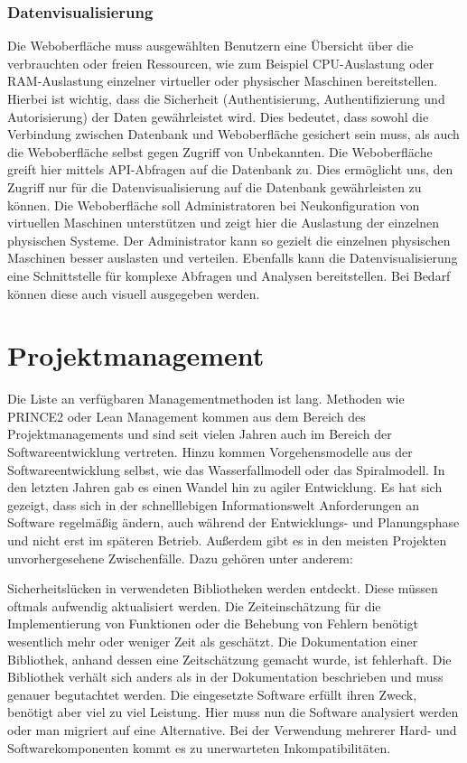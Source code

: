 \subsection{Datenvisualisierung}
Die Weboberfläche muss ausgewählten Benutzern eine Übersicht über die
verbrauchten oder freien Ressourcen, wie zum Beispiel CPU-Auslastung oder
RAM-Auslastung einzelner virtueller oder physischer Maschinen bereitstellen.
Hierbei ist wichtig, dass die Sicherheit (Authentisierung, Authentifizierung
und Autorisierung) der Daten gewährleistet wird. Dies bedeutet, dass sowohl die
Verbindung zwischen Datenbank und Weboberfläche gesichert sein muss, als auch
die Weboberfläche selbst gegen Zugriff von Unbekannten. Die Weboberfläche
greift hier mittels API-Abfragen auf die Datenbank zu. Dies ermöglicht uns, den
Zugriff nur für die Datenvisualisierung auf die Datenbank gewährleisten zu
können. Die Weboberfläche soll Administratoren bei Neukonfiguration von
virtuellen Maschinen unterstützen und zeigt hier die Auslastung der einzelnen
physischen Systeme. Der Administrator kann so gezielt die einzelnen physischen
Maschinen besser auslasten und verteilen. Ebenfalls kann die
Datenvisualisierung eine Schnittstelle für komplexe Abfragen und Analysen
bereitstellen. Bei Bedarf können diese auch visuell ausgegeben werden.
\mr%

\chapter{Projektmanagement}
Die Liste an verfügbaren Managementmethoden ist lang. Methoden wie PRINCE2 oder
Lean Management kommen aus dem Bereich des Projektmanagements und sind seit
vielen Jahren auch im Bereich der Softwareentwicklung vertreten. Hinzu kommen
Vorgehensmodelle aus der Softwareentwicklung selbst, wie das Wasserfallmodell
oder das Spiralmodell. In den letzten Jahren gab es einen Wandel hin zu agiler
Entwicklung. Es hat sich gezeigt, dass sich in der schnelllebigen
Informationswelt Anforderungen an Software regelmäßig ändern, auch während der
Entwicklungs- und Planungsphase und nicht erst im späteren Betrieb. Außerdem
gibt es in den meisten Projekten unvorhergesehene Zwischenfälle. Dazu gehören
unter anderem:

\begin{outline}
  \1 Sicherheitslücken in verwendeten Bibliotheken werden entdeckt. Diese
  müssen oftmals aufwendig aktualisiert werden.
  \1 Die Zeiteinschätzung für die Implementierung von Funktionen oder die
  Behebung von Fehlern benötigt wesentlich mehr oder weniger Zeit als
  geschätzt.
  \1 Die Dokumentation einer Bibliothek, anhand dessen eine Zeitschätzung
  gemacht wurde, ist fehlerhaft. Die Bibliothek verhält sich anders als in der
  Dokumentation beschrieben und muss genauer begutachtet werden.
  \1 Die eingesetzte Software erfüllt ihren Zweck, benötigt aber viel zu viel
  Leistung. Hier muss nun die Software analysiert werden oder man migriert auf
  eine Alternative.
  \1 Bei der Verwendung mehrerer Hard- und Softwarekomponenten kommt es zu
  unerwarteten Inkompatibilitäten.
\end{outline}

